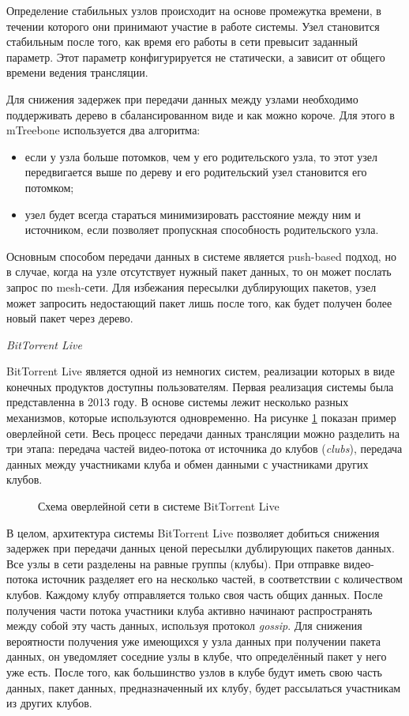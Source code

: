 		Определение стабильных узлов происходит на основе промежутка времени, в течении которого они принимают участие в
		работе системы. Узел становится стабильным после того, как время его работы в сети превысит заданный параметр.
		Этот параметр конфигурируется не статически, а зависит от общего времени ведения трансляции.

		Для снижения задержек при передачи данных между узлами необходимо поддерживать дерево в сбалансированном виде и
		как можно короче. Для этого в mTreebone используется два алгоритма:
		\begin{itemize}
			\item если у узла больше потомков, чем у его родительского узла, то этот узел передвигается выше по дереву и
			его родительский узел становится его потомком;
			\item узел будет всегда стараться минимизировать расстояние между ним и источником, если позволяет
			пропускная способность родительского узла.
		\end{itemize}

		Основным способом передачи данных в системе является push-based подход, но в случае, когда на узле отсутствует
		нужный пакет данных, то он может послать запрос по mesh-сети. Для избежания пересылки дублирующих пакетов, узел
		может запросить недостающий пакет лишь после того, как будет получен более новый пакет через дерево.

		\textit{BitTorrent Live}

		BitTorrent Live является одной из немногих систем, реализации которых в виде конечных продуктов доступны
		пользователям. Первая реализация системы была представленна в 2013 году. В основе системы лежит несколько разных
		механизмов, которые используются одновременно. На рисунке \ref{img:btlive-overlay} показан пример оверлейной
		сети. Весь процесс передачи данных трансляции можно разделить на три этапа: передача частей видео-потока от
		источника до клубов (\textit{clubs}), передача данных между участниками клуба и обмен данными с участниками
		других клубов.

		\begin{figure}[h]
			\caption{Схема оверлейной сети в системе BitTorrent Live}
			\label{img:btlive-overlay}
		\end{figure}

		В целом, архитектура системы BitTorrent Live позволяет добиться снижения задержек при передачи данных ценой
		пересылки дублирующих пакетов данных. Все узлы в сети разделены на равные группы (клубы). При отправке
		видео-потока источник разделяет его на несколько частей, в соответствии с количеством клубов. Каждому клубу
		отправляется только своя часть общих данных. После получения части потока участники клуба активно начинают
		распространять между собой эту часть данных, используя протокол \textit{gossip}. Для снижения вероятности
		получения уже имеющихся у узла данных при получении пакета данных, он уведомляет соседние узлы в клубе, что
		определённый пакет у него уже есть. После того, как большинство узлов в клубе будут иметь свою часть данных,
		пакет данных, предназначенный их клубу, будет рассылаться участникам из других клубов.

